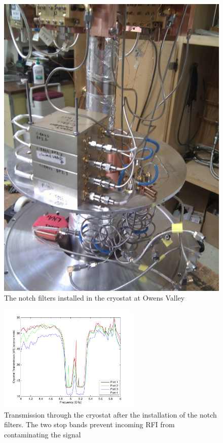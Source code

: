 \begin{figure}
 \centering
 \includegraphics[height=0.6\textheight]{./images/NotchFilter/cryostatInstall.jpg}
 \caption{The notch filters installed in the cryostat at Owens Valley}
 \label{fig:cryostatInstall}
\end{figure}

\begin{figure}
 \centering
 \includegraphics[width=0.6\textwidth]{./images/NotchFilter/CryostatTransmission.pdf}
 \caption{Transmission through the cryostat after the installation of the notch filters. The two stop bands prevent incoming RFI from contaminating the signal}
 \label{fig:cryostatTransmission}
\end{figure}
% 

